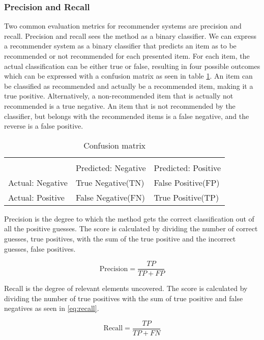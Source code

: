 \subsubsection{Precision and Recall}
Two common evaluation metrics for recommender systems are precision and recall\cite{recsyshandbook}. Precision and recall sees the method as a binary classifier. We can express a recommender system as a binary classifier that predicts an item as to be recommended or not recommended for each presented item. For each item, the actual classification can be either true or false, resulting in four possible outcomes which can be expressed with a confusion matrix as seen in table \ref{tab:testandevaluation_confusionmatrix}. An item can be classified as recommended and actually be a recommended item, making it a true positive. Alternatively, a non-recommended item that is actually not recommended is a true negative. An item that is not recommended by the classifier, but belongs with the recommended items is a false negative, and the reverse is a false positive.

\begin{table}[H]\label{tab:testandevaluation_confusionmatrix}
	\centering
	\begin{tabular}{ l|ll }
		\multicolumn{3}{l}{} \\
		& Predicted: Negative & Predicted: Positive \\ \hline
		Actual: Negative & True Negative(TN) & False Positive(FP) \\
		Actual: Positive & False Negative(FN) & True Positive(TP) \\ \hline
	\end{tabular}
	\caption{Confusion matrix}
\end{table}

Precision is the degree to which the method gets the correct classification out of all the positive guesses. The score is calculated by dividing the number of correct guesses, true positives, with the sum of the true positive and the incorrect guesses, false positives.

\begin{equation}\label{eq:precision}
	\text{Precision} = \frac{TP}{TP+FP}
\end{equation}

Recall is the degree of relevant elements uncovered. The score is calculated by dividing the number of true positives with the sum of true positive and false negatives as seen in \ref{eq:recall}.

\begin{equation}\label{eq:recall}
\text{Recall} = \frac{TP}{TP+FN}
\end{equation}

